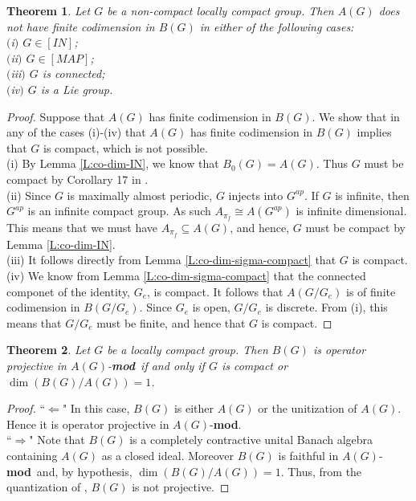 \documentclass[10pt]{amsart}
\newtheorem{thm}{Theorem}
\numberwithin{thm}{section}
\numberwithin{equation}{section}
\begin{document}
\begin{thm}\label{T:finite-co-dim}
Let $G$ be a non-compact locally compact group. Then $A(G)$ does not have finite codimension in $B(G)$
in either of the following cases:\\
$($i$)$ $G\in [IN]$;\\
$($ii$)$ $G\in [MAP]$;\\
$($iii$)$ $G$ is connected;\\
$($iv$)$ $G$ is a Lie group.
\end{thm}

\begin{proof}
Suppose that $A(G)$ has finite codimension in $B(G)$. We show that in any of the cases
 (i)-(iv) that $A(G)$ has finite codimension in $B(G)$
implies that $G$ is compact, which is not possible.\\  
(i) By Lemma \ref{L:co-dim-IN}, we know that $B_0(G)=A(G)$. Thus $G$ must be compact 
by Corollary 17 in \cite{BelFor}.\\
(ii) Since $G$ is maximally almost periodic, $G$ injects into $G^{ap}$. If $G$ is infinite, then $G^{ap}$ 
is an infinite compact group. As such $A_{\pi _f}\cong A(G^{ap})$ is infinite dimensional. This means 
that we must have $A_{\pi _f}\subseteq A(G)$, and hence, $G$ must be compact by Lemma \ref{L:co-dim-IN}.\\ 
(iii) It follows directly from Lemma \ref{L:co-dim-sigma-compact} that $G$ is compact.\\
(iv) We know from Lemma \ref{L:co-dim-sigma-compact} that the connected componet of the identity, $G_e$, is compact. 
It follows that $A(G/G_e)$ is of finite codimension in $B(G/G_e)$. Since $G_e$ is open, $G/G_e$ is discrete. From (i), this means 
that $G/G_e$ must be finite, and hence that $G$ is compact.
\end{proof}

\begin{thm}
Let $G$ be a locally compact group. Then $B(G)$ is operator projective in 
$A(G)$-{\textbf{mod}}\ if and only if $G$ is compact or $\dim (B(G)/A(G))=1$. 
\end{thm}

\begin{proof}
``$\Leftarrow$" In this case, $B(G)$ is either $A(G)$ or the unitization of $A(G)$. 
Hence it is operator projective in $A(G)$-{\textbf{mod}}.\\
``$\Rightarrow$" Note that $B(G)$ is a completely contractive unital Banach algebra containing 
$A(G)$ as a closed ideal. Moreover $B(G)$ is faithful in $A(G)$-{\textbf{mod}}\ and, by hypothesis,
$\dim(B(G)/A(G))=1$. Thus, from the quantization of \cite[Proposition 1.3]{DP04}, $B(G)$ is not projective.
\end{proof}
\end{document}
